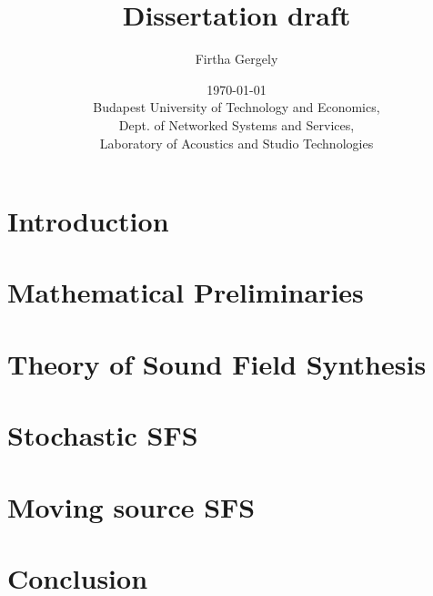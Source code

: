 \documentclass[12pt,a4paper]{report}
\title{ Dissertation draft}
\date{\today \\
Budapest University of Technology and Economics, \\ Dept. of Networked Systems and Services, \\ Laboratory of Acoustics and Studio Technologies}
\author{Firtha Gergely}
\begin{document}
%
\maketitle
\tableofcontents
\printnomenclature
%
\chapter{Introduction}
%
\chapter{Mathematical Preliminaries}
\label{sec:math}

%
\chapter{Theory of Sound Field Synthesis}
\label{sec:theory}

%
\chapter{Stochastic SFS}
\label{sec:stochastic}

%
\chapter{Moving source SFS}
\label{sec:moving_source}

%
\chapter{Conclusion}




\end{document}
